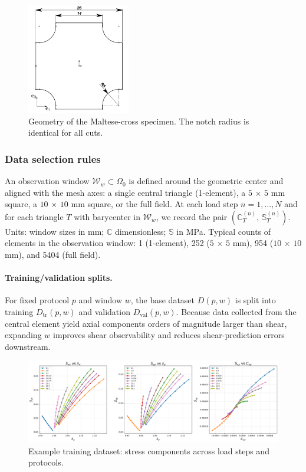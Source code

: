 \documentclass[journal,article,submit,pdftex,moreauthors]{Definitions/mdpi}
\begin{document}
\begin{figure}[H]
  \centering
  \includegraphics[width=0.4\textwidth]{../img/malt_geom.png}
  \caption{Geometry of the Maltese-cross specimen. The notch radius is identical for all cuts.}
  \label{fig:malt_geometry}
\end{figure}

\subsubsection{Data selection rules}
An observation window $\mathcal W_w\subset\Omega_0$ is defined around the geometric center and aligned with the mesh axes: a single central triangle (1-element), a $5\,\times\,5$ mm square, a $10\,\times\,10$ mm square, or the full field. At each load step $n=1,\dots,N$ and for each triangle $T$ with barycenter in $\mathcal W_w$, we record the pair $(\mathbb C_T^{(n)},\,\mathbb S_T^{(n)})$. Units: window sizes in mm; $\mathbb C$ dimensionless; $\mathbb S$ in MPa. Typical counts of elements in the observation window: 1 (1-element), 252 ($5\,\times\,5$ mm), 954 ($10\,\times\,10$ mm), and 5404 (full field).

\paragraph{Training/validation splits.}
For fixed protocol $p$ and window $w$, the base dataset $D(p,w)$ is split into training $D_{\mathrm{tr}}(p,w)$ and validation $D_{\mathrm{val}}(p,w)$. Because data collected from the central element yield axial components orders of magnitude larger than shear, expanding $w$ improves shear observability and reduces shear-prediction errors downstream.

\begin{figure}[H]
  \centering
  \includegraphics[width=1.0\textwidth]{../img/all_stress_plots.png}
  \caption{Example training dataset: stress components across load steps and protocols.}
  \label{fig:training_data}
\end{figure}
\end{document}

